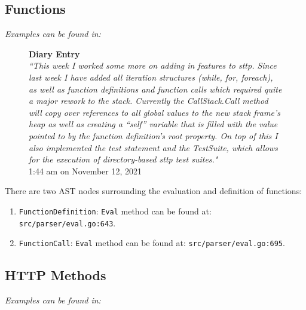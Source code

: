 \documentclass[]{full}
\theoremstyle{definition}
\begin{document}
\subsection{Functions}

\textit{Examples can be found in: }

\begin{figure}[H]
    \begin{center}
        \textbf{Diary Entry}\\[0.5em]
        \textit{``This week I worked some more on adding in features to sttp. Since last week I have added all iteration structures (while, for, foreach), as well as function definitions and function calls which required quite a major rework to the stack. Currently the CallStack.Call method will copy over references to all global values to the new stack frame’s heap as well as creating a “self” variable that is filled with the value pointed to by the function definition’s root property. On top of this I also implemented the test statement and the TestSuite, which allows for the execution of directory-based sttp test suites."}\\[0.5em]
        \tiny{1:44 am on November 12, 2021}
    \end{center}
\end{figure}

There are two AST nodes surrounding the evaluation and definition of functions:

\begin{enumerate}
    \item \verb|FunctionDefinition|: \verb|Eval| method can be found at: \verb|src/parser/eval.go:643|.
    \item \verb|FunctionCall|: \verb|Eval| method can be found at: \verb|src/parser/eval.go:695|.
\end{enumerate}

\subsection{HTTP Methods}

\textit{Examples can be found in: }
\end{document}
